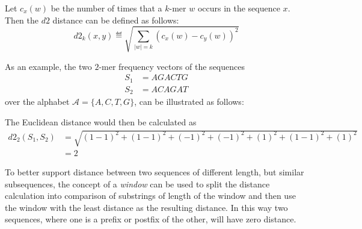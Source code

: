 Let $c_x(w)$ be the number of times that a $k$-mer $w$ occurs in the sequence
$x$. Then the $d2$ distance can be defined as follows:
\begin{equation}
  d2_k(x,y) \eqdef \sqrt{\sum_{|w|=k} (c_x(w) - c_y(w))^2}
\end{equation}

As an example, the two $2$-mer frequency vectors of the sequences
\begin{align*}
  S_1 &= AGACTG \\
  S_2 &= ACAGAT
\end{align*}
over the alphabet $\mathcal{A} = \{A,C,T,G\}$, can be illustrated as follows:

\begin{table}[!h]
\centering
{}
\end{table}

The Euclidean distance would then be calculated as
\begin{align*}
  d2_2(S_1, S_2)
    &= \sqrt{(1-1)^2 + (1-1)^2 + (-1)^2 + (-1)^2 + (1)^2 + (1-1)^2 + (1)^2} \\
    &= 2
\end{align*}

To better support distance between two sequences of different length, but
similar subsequences, the concept of a \emph{window} can be used to split the
distance calculation into comparison of substrings of length of the window
and then use the window with the least distance as the resulting distance. In
this way two sequences, where one is a prefix or postfix of the other, will
have zero distance.




